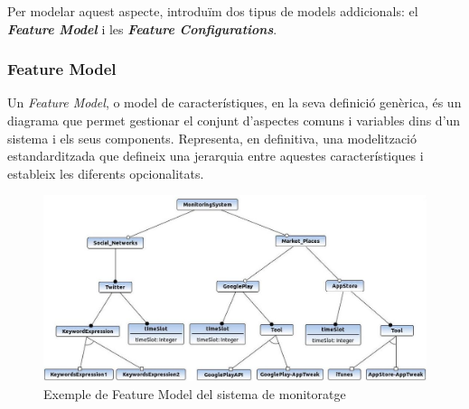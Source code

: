 Per modelar aquest aspecte, introduïm dos tipus de models addicionals: el \textbf{\textit{Feature Model}} i les \textbf{\textit{Feature Configurations}}.

\subsubsection{Feature Model}

Un \textit{Feature Model}, o model de característiques, en la seva definició genèrica, és un diagrama que permet gestionar el conjunt d'aspectes comuns i variables dins d'un sistema i els seus components. Representa, en definitiva, una modelització estandarditzada que defineix una jerarquia entre aquestes característiques i estableix les diferents opcionalitats.\\

\begin{figure}
\centering
\includegraphics[width=14cm]{Figures/Figure17}
\decoRule
\caption{Exemple de Feature Model del sistema de monitoratge}
\label{fig:Figura17}
\end{figure}

